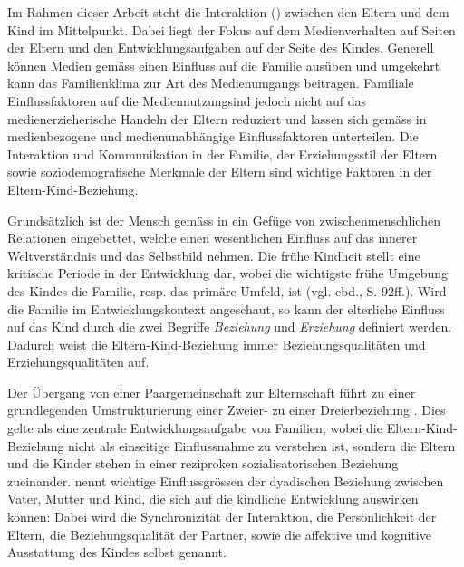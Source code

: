Im Rahmen dieser Arbeit steht die Interaktion () zwischen den Eltern und dem Kind im Mittelpunkt. Dabei liegt der Fokus auf dem Medienverhalten auf Seiten der Eltern und den Entwicklungsaufgaben auf der Seite des Kindes. Generell können Medien gemäss  einen Einfluss auf die Familie ausüben und umgekehrt kann das Familienklima zur Art des Medienumgangs beitragen. Familiale Einflussfaktoren auf die Mediennutzungsind  jedoch  nicht  auf  das  medienerzieherische  Handeln  der  Eltern  reduziert  und  lassen sich gemäss \cite{Kammerl2012} in medienbezogene und medienunabhängige Einflussfaktoren unterteilen. Die Interaktion und Kommunikation in der Familie, der Erziehungsstil der Eltern sowie soziodemografische Merkmale der Eltern sind wichtige Faktoren in der Eltern-Kind-Beziehung.

Grundsätzlich ist der Mensch gemäss  in ein Gefüge von zwischenmenschlichen Relationen eingebettet, welche einen wesentlichen Einfluss auf das innerer Weltverständnis und das Selbstbild nehmen.  Die frühe Kindheit stellt eine kritische Periode in der Entwicklung dar, wobei die wichtigste frühe Umgebung des Kindes die Familie, resp. das primäre Umfeld, ist (vgl. ebd., S. 92ff.). Wird die Familie im Entwicklungskontext angeschaut, so kann der elterliche Einfluss auf das Kind durch die zwei Begriffe \textit{Beziehung} und \textit{Erziehung} definiert werden. Dadurch weist die Eltern-Kind-Beziehung immer Beziehungsqualitäten und Erziehungsqualitäten auf.  

Der Übergang von einer Paargemeinschaft zur Elternschaft führt zu einer grundlegenden Umstrukturierung einer Zweier- zu einer Dreierbeziehung \cite{Hofer1992, Buergin1998}. Dies gelte als eine zentrale Entwicklungsaufgabe von Familien, wobei die Eltern-Kind-Beziehung nicht als einseitige Einflussnahme zu verstehen ist, sondern die Eltern und die Kinder stehen in einer reziproken sozialisatorischen Beziehung zueinander.  nennt wichtige Einflussgrössen der dyadischen Beziehung zwischen Vater, Mutter und Kind, die sich auf die kindliche Entwicklung auswirken können: Dabei wird die Synchronizität der Interaktion, die Persönlichkeit der Eltern, die Beziehungsqualität der Partner, sowie die affektive und kognitive Ausstattung des Kindes selbst genannt. 

